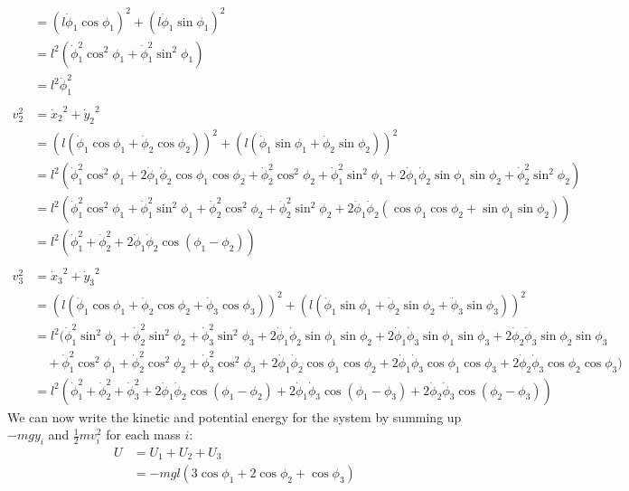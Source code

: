 \documentclass{article}
\begin{document}
\begin{appendices}
\begin{align}
	&= (l\dot\phi_1\cos\phi_1)^2
		+(l\dot\phi_1\sin\phi_1)^2 \\
	&= l^2(\dot\phi_1^2\cos^2\phi_1+\dot\phi_1^2\sin^2\phi_1) \\
	&= l^2\dot\phi_1^2 \\\\
	v_2^2 &= {\dot x_2}^2+{\dot y_2}^2 \\
	&= (l(\dot\phi_1\cos\phi_1+\dot\phi_2\cos\phi_2))^2
	  +(l(\dot\phi_1\sin\phi_1+\dot\phi_2\sin\phi_2))^2 \\
	&= l^2\left( \dot\phi_1^2\cos^2\phi_1 
		+ 2\dot\phi_1\dot\phi_2\cos\phi_1\cos\phi_2 
		+ \dot\phi_2^2\cos^2\phi_2 + \dot\phi_1^2\sin^2\phi_1 
		+ 2\dot\phi_1\dot\phi_2\sin\phi_1\sin\phi_2 
		+ \dot\phi_2^2\sin^2\phi_2 \right) \\
	&= l^2\left( \dot\phi_1^2\cos^2\phi_1 + \dot\phi_1^2\sin^2\phi_1
		+ \dot\phi_2^2\cos^2\phi_2 + \dot\phi_2^2\sin^2\phi_2
		+ 2\dot\phi_1\dot\phi_2(\cos\phi_1\cos\phi_2 + \sin\phi_1\sin\phi_2)
		 \right) \\
	&= l^2\left( \dot\phi_1^2 + \dot\phi_2^2
		+ 2\dot\phi_1\dot\phi_2\cos(\phi_1 - \phi_2) \right) \\\\
	v_3^2 &= {\dot x_3}^2+{\dot y_3}^2 \\
	&= (l(\dot\phi_1\cos\phi_1+\dot\phi_2\cos\phi_2+\dot\phi_3\cos\phi_3))^2 
	  +(l(\dot\phi_1\sin\phi_1+\dot\phi_2\sin\phi_2+\dot\phi_3\sin\phi_3))^2 \\
	&= l^2\bigl( \dot\phi_1^2\sin^2\phi_1+\dot\phi_2^2\sin^2\phi_2
	   +\dot\phi_3^2\sin^2\phi_3 + 2\dot\phi_1\dot\phi_2\sin\phi_1\sin\phi_2
	   +2\dot\phi_1\dot\phi_3\sin\phi_1\sin\phi_3
	   +2\dot\phi_2\dot\phi_3\sin\phi_2\sin\phi_3 \\
	   &\quad +\dot\phi_1^2\cos^2\phi_1+\dot\phi_2^2\cos^2\phi_2
	   +\dot\phi_3^2\cos^2\phi_3 + 2\dot\phi_1\dot\phi_2\cos\phi_1\cos\phi_2
	   +2\dot\phi_1\dot\phi_3\cos\phi_1\cos\phi_3
	   +2\dot\phi_2\dot\phi_3\cos\phi_2\cos\phi_3
	\bigr) \\
	&= l^2\left( \dot\phi_1^2+\dot\phi_2^2 +\dot\phi_3^2 
	   +2\dot\phi_1\dot\phi_2\cos(\phi_1-\phi_2)
	   +2\dot\phi_1\dot\phi_3\cos(\phi_1-\phi_3)
	   +2\dot\phi_2\dot\phi_3\cos(\phi_2-\phi_3) \right) 
\end{align}
We can now write the kinetic and potential energy for the system by summing
up $-mgy_i$ and $\frac{1}{2}mv_i^2$ for each mass $i$:
\begin{align}
	U &= U_1 + U_2 + U_3 \\
	&= -mgl\left(3\cos\phi_1+2\cos\phi_2+\cos\phi_3 \right) \\\\

\end{align}
\end{appendices}
\end{document}
